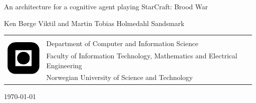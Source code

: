 \documentclass[a4paper,12pt]{report}
\title{\papertitle}
\author{\authors}
\def \authors {Ken B\o{}rge Viktil and Martin Tobias Holmedahl Sandsmark}
\def \papertitle {An architecture for a cognitive agent playing StarCraft:
Brood War}
\begin{document}
\begin{titlepage}
\begin{center}
\vspace*{2cm}
\huge{\papertitle}

\vspace{.5cm}
\large{\authors}

\vspace{12cm}
\end{center}
\normalsize
\begin{table}[!h]
\begin{tabular}{ll}
\multirow{4}{*}{\includegraphics[width=20mm]{graphics/logo.png}} & \\
& Department of Computer and Information Science \\
& Faculty of Information Technology, Mathematics and Electrical Engineering \\
& Norwegian University of Science and Technology \\
\end{tabular}
\end{table}
\vspace{.5cm}
\begin{center}
\today
\end{center}
\end{titlepage}
\newpage
\thispagestyle{empty}
\mbox{}

\begin{abstract}
We present an overview of existing research into the use of cognitive models
for artificial intelligence, the game Starcraft: Broodwar, and research into
architectures for artificial intelligence programs for playing the game.
\end{abstract}


\tableofcontents






\printbibliography

\appendix

\end{document}
